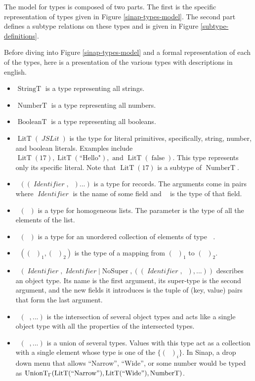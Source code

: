 \documentclass[12pt]{article}
\DeclareMathOperator{\StringT}{StringT}
\DeclareMathOperator{\NumberT}{NumberT}
\DeclareMathOperator{\BooleanT}{BooleanT}
\DeclareMathOperator{\LitT}{LitT}
\DeclareMathOperator{\JSLit}{\textit{JSLit}}
\DeclareMathOperator{\RecT}{RecT_\Gamma}
\DeclareMathOperator{\ObjT}{ObjT_\Gamma}
\DeclareMathOperator{\ListT}{ListT_\Gamma}
\DeclareMathOperator{\SetT}{SetT_\Gamma}
\DeclareMathOperator{\MapT}{MapT_\Gamma}
\DeclareMathOperator{\UnionT}{UnionT_\Gamma}
\DeclareMathOperator{\InterT}{InterT_\Gamma}
\DeclareMathOperator{\Identifier}{\textit{Identifier}}
\DeclareMathOperator{\Type}{{\textit{Type}_\Gamma}}
\DeclareMathOperator{\NoSuper}{NoSuper}
\begin{document}
The model for types is composed of two parts. The first is the 
specific representation of types given in Figure 
\ref{sinap-types-model}. The second part defines a subtype
relations on these types and is given in Figure \ref{subtype-definitions}.

Before diving into Figure \ref{sinap-types-model} and 
a formal representation of each of the types, here is a presentation 
of the various types with descriptions in english. 
\begin{itemize}
    \item \(\StringT\) is a type representing all strings.
    \item \(\NumberT\) is a type representing all numbers.
    \item \(\BooleanT\) is a type representing all booleans.
    \item \(\LitT(\JSLit)\) is the type for literal primitives, specifically,
    string, number, and boolean literals. 
    Examples include \(\LitT(17), \LitT(\text{``Hello"}), \text{ and } 
    \LitT(\operatorname{false})\). This type represents only its specific literal. 
    Note that \(\LitT(17)\) is a subtype of \(\NumberT\).
    \item \(\RecT((\Identifier, \Type)...)\) is a type for records. 
    The arguments come in pairs where
    \(\Identifier\) is the name of some field and \(\Type\) is the
    type of that field.
    \item \(\ListT(\Type)\) is a type for homogeneous lists. The
    parameter is the type of all the elements of the list. 
    \item \(\SetT(\Type)\) is a type for an unordered collection
    of elements of type \(\Type\).
    \item \(\MapT((\Type)_1, (\Type)_2)\) is the type of a mapping from 
    \((\Type)_1\) to \((\Type)_2\).
    \item \(\ObjT(\Identifier, \Identifier | \NoSuper, ((\Identifier, \Type), ...))\)
    describes an object type. Its name is the first argument, 
    its super-type is the second argument, and the new fields 
    it introduces is the tuple of (key, value) pairs that form the
    last argument. 
    \item \(\InterT(\ObjT,  ...)\) is the intersection of several 
    object types and acts like a single object type with all the 
    properties of the intersected types. 
    \item \(\UnionT(\Type, ...)\) is a union of several types. 
    Values with this type act as a collection with a single element
    whose type is one of the \(\{(\Type)_i\}\). In Sinap, a drop down 
    menu that allows ``Narrow'', ``Wide'', or some number would be 
    typed as \(\UnionT(\LitT(``\text{Narrow}"), \LitT(``\text{Wide}"),
     \NumberT)\).
\end{itemize}
\end{document}
